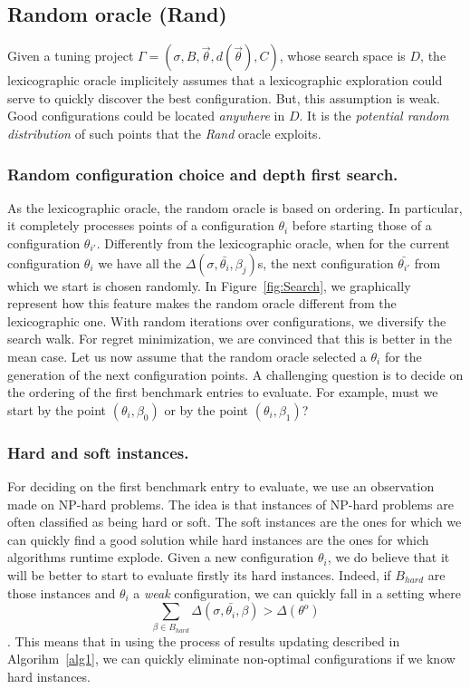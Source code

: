 \documentclass[10pt, conference, compsocconf]{IEEEtran}
\begin{document}
\subsection{Random  oracle (Rand)}

Given a tuning project
$\Gamma = (\sigma, B, \vec{\theta}, d(\vec{\theta}), C)$, whose search
space is $D$, the lexicographic oracle implicitely assumes that a
lexicographic exploration could serve to quickly discover the best
configuration. But, this assumption is weak. Good configurations could
be located {\it anywhere} in $D$. It is the {\it potential random
  distribution} of such points that the {\it Rand} oracle exploits.
 
\subsubsection{ Random configuration choice and depth first search.} 

As the lexicographic oracle, the random oracle is based on
ordering. In particular, it completely processes points of a
configuration $\theta_{i}$ before starting those of a configuration
$\theta_{i'}$.  Differently from the lexicographic oracle, when for
the current configuration $\theta_i$ we have all the
$\Delta(\sigma, \bar{\theta_i}, \beta_j)$s, the next configuration
$\bar{\theta_{i'}}$ from which we start is chosen randomly. In
Figure~\ref{fig:Search}, we graphically represent how this feature
makes the random oracle different from the lexicographic one. With
random iterations over configurations, we diversify the search
walk. For regret minimization, we are convinced that this is better in
the mean case.  Let us now assume that the random oracle selected a
$\theta_i$ for the generation of the next configuration points. A
challenging question is to decide on the ordering of the first
benchmark entries to evaluate.  For example, must we start by the
point $(\theta_i, \beta_0)$ or by the point $(\theta_i, \beta_1)$?

\subsubsection{Hard and soft instances.} 

For deciding on the first benchmark entry to evaluate, we use an
observation made on NP-hard problems.  The idea is that instances of
NP-hard problems are often classified as being hard or soft. The soft
instances are the ones for which we can quickly find a good solution
while hard instances are the ones for which algorithms runtime
explode.  Given a new configuration $\theta_i$, we do believe that it
will be better to start to evaluate firstly its hard
instances. Indeed, if $B_{hard}$ are those instances and $\theta_i$ a
{\it weak} configuration, we can quickly fall in a setting where
\[ \sum_{\beta \in B_{hard}} \Delta(\sigma, \bar{\theta_i}, \beta) >
\Delta(\theta^o)\].
This means that in using the process of results updating described in
Algorihm~\ref{alg1}, we can quickly eliminate non-optimal
configurations if we know hard instances.
\end{document}
